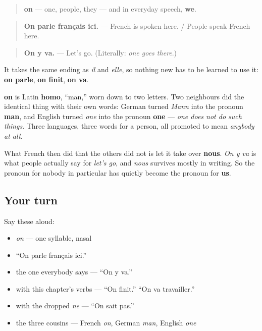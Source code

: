 \begin{cousinweb}
\begin{quote}
\textbf{on} — one, people, they — and in everyday speech, \textbf{we}.
\end{quote}

\begin{quote}
\textbf{On parle français ici.} — French is spoken here. / People speak French here.
\end{quote}

\begin{quote}
\textbf{On y va.} — Let's go. (Literally: \emph{one goes there}.)
\end{quote}

It takes the same ending as \emph{il} and \emph{elle}, so nothing new has to be learned to use it: \textbf{on parle}, \textbf{on finit}, \textbf{on va}.

\textbf{on} is Latin \textbf{homo}, \textquotedblleft{}man,\textquotedblright{} worn down to two letters. Two neighbours did the identical thing with their own words: German turned \emph{Mann} into the pronoun \textbf{man}, and English turned \emph{one} into the pronoun \textbf{one} — \emph{one does not do such things}. Three languages, three words for a person, all promoted to mean \emph{anybody at all}.

What French then did that the others did not is let it take over \textbf{nous}. \emph{On y va} is what people actually say for \emph{let's go}, and \emph{nous} survives mostly in writing. So the pronoun for nobody in particular has quietly become the pronoun for \textbf{us}.
\end{cousinweb}

\subsection*{Your turn}
Say these aloud:

\begin{itemize}
\raggedright
  \item \emph{on} — one syllable, nasal
  \item \textquotedblleft{}On parle français ici.\textquotedblright{}
  \item the one everybody says — \textquotedblleft{}On y va.\textquotedblright{}
  \item with this chapter's verbs — \textquotedblleft{}On finit.\textquotedblright{} \textquotedblleft{}On va travailler.\textquotedblright{}
  \item with the dropped \emph{ne} — \textquotedblleft{}On sait pas.\textquotedblright{}
  \item the three cousins — French \emph{on}, German \emph{man}, English \emph{one}
\end{itemize}

